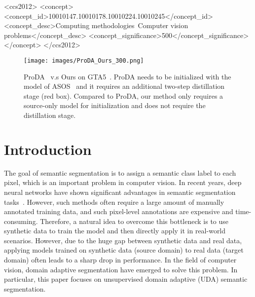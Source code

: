 \documentclass[sigconf]{acmart}
\begin{document}
\begin{CCSXML}
		<ccs2012>
		<concept>
		<concept_id>10010147.10010178.10010224.10010245</concept_id>
		<concept_desc>Computing methodologies~Computer vision problems</concept_desc>
		<concept_significance>500</concept_significance>
		</concept>
		</ccs2012>
	\end{CCSXML}
	
	
	


\maketitle
	\begin{figure}
		\centering
		\texttt{[image: images/ProDA\_Ours\_300.png]}
		\vspace{-0.25cm}
		\caption{ProDA~\cite{zhang2021prototypical} v.s Ours on GTA5~\cite{richter2016playing}. ProDA needs to be initialized with the model of ASOS~\cite{tsai2018learning} and it requires an additional two-step distillation stage (red box). Compared to ProDA, our method only requires a source-only model for initialization and does not require the distillation stage.}
		\label{figure:ProDA_Ours}
\end{figure}
	
	\section{Introduction}
	
	The goal of semantic segmentation is to assign a semantic class label to each pixel, which is an important problem in computer vision. In recent years, deep neural networks have shown significant advantages in semantic segmentation tasks~\cite{chen2017deeplab,chen2018encoder,liu2019auto,long2015fully,zhao2017pyramid}. However, such methods often require a large amount of manually annotated training data, and such pixel-level annotations are expensive and time-consuming. Therefore, a natural idea to overcome this bottleneck is to use synthetic data to train the model and then directly apply it in real-world scenarios. However, due to the huge gap between synthetic data and real data, applying models trained on synthetic data (source domain) to real data (target domain) often leads to a sharp drop in performance. In the field of computer vision, domain adaptive segmentation have emerged to solve this problem. In particular, this paper focuses on unsupervised domain adaptive (UDA) semantic segmentation.
\end{document}
